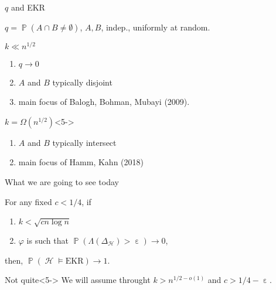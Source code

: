 \documentclass{beamer}
\DeclareMathOperator{\Hy}{\mathcal{H}}
\DeclareMathOperator{\Prob}{\mathbb{P}}
\DeclareMathOperator{\eps}{\varepsilon}
\begin{document}
\begin{frame}{$q$ and EKR}
  \begin{definition}
    $q = \Prob (A \cap B \neq \emptyset)$, $A, B$, indep., uniformly at random.
  \end{definition}
  \begin{block}{$k \ll n^{1/2}$}
    \begin{enumerate}
      \item<2-> $q \to 0$
      \item<3-> $A$ and $B$ typically disjoint
      \item<4-> main focus of Balogh, Bohman, Mubayi (2009).
    \end{enumerate}
  \end{block}
  \begin{block}{$k = \Omega(n^{1/2})$}<5->
    \begin{enumerate}
      \item<6-> $A$ and $B$ typically intersect
      \item<7-> main focus of Hamm, Kahn (2018)
    \end{enumerate}
  \end{block}
\end{frame}

\begin{frame}{What we are going to see today}
  \begin{theorem}
    For any fixed $c < 1/4$, if
    \begin{enumerate}
      \item<2-> $k < \sqrt{c n \log n}$
      \item<3-> $\varphi$ is such that $\Prob(\Lambda(\Delta_{\Hy}) > \eps) \to 0$,
    \end{enumerate}
    then, $\Prob(\Hy \vDash \mathrm{EKR}) \to 1$.
  \end{theorem}
  \begin{block}{Not quite}<5->
    We will assume throught $k > n^{1/2 - o(1)}$ and $c > 1/4 - \eps$.
  \end{block}
\end{frame}

\end{document}
